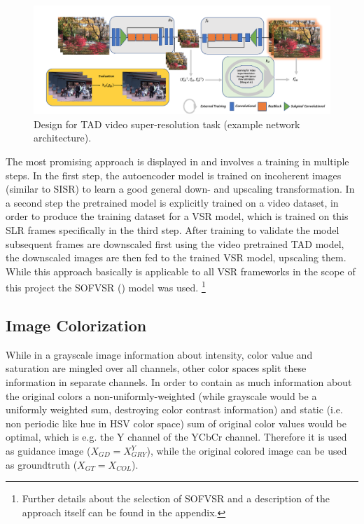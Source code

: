 \begin{figure}[!htbp]
	\centering
	\includegraphics[width=14cm]{figures/architecture_video_external}
	\caption{Design for \ac{TAD} video super-resolution task (example network
  architecture).}
  \label{fig:architecture_video}
\end{figure}

The most promising approach is displayed in  and involves a training in multiple steps. In the first step, the autoencoder model is trained on incoherent images (similar to \ac{SISR}) to learn a good general down- and upscaling transformation. In a second step the pretrained model is explicitly trained on a video dataset, in order to produce the training dataset for a \ac{VSR} model, which is trained on this SLR frames specifically in the third step. After training to validate the model subsequent frames are downscaled first using the video pretrained \ac{TAD} model, the downscaled images are then fed to the trained \ac{VSR} model, upscaling them. While this approach basically is applicable to all \ac{VSR} frameworks in the scope of this project the SOFVSR (\cite{LFVSRTHROFE}) model was used. \footnote{Further details about the selection of SOFVSR and a description of the approach itself can be found in the appendix.}

\subsection*{Image Colorization}
While in a grayscale image information about intensity, color value and
saturation are mingled over all channels, other color spaces split these
information in separate channels. In order to contain as much information about the original colors a non-uniformly-weighted (while grayscale would be a uniformly weighted sum, destroying color contrast information) and static (i.e. non periodic like hue in HSV color space) sum of original color values would be optimal, which is e.g. the Y channel of the YCbCr channel. Therefore it is used as guidance image ($X_{GD} = X_{GRY}^Y$), while the original colored image can be used as groundtruth ($X_{GT} = X_{COL}$).

